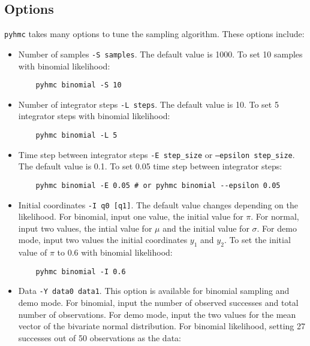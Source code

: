 \documentclass[10pt,letterpaper]{article}
\begin{document}

\subsection{Options}
\label{sub:options}

\texttt{pyhmc} takes many options to tune the sampling algorithm.  These
options include:

\begin{itemize}
	\item Number of samples \texttt{-S samples}.  The default value is 1000.  To set 10
samples with binomial likelihood:

\begin{verbatim}
	pyhmc binomial -S 10
\end{verbatim}

	\item Number of integrator steps \texttt{-L steps}.  The default value is
		10.  To set 5 integrator steps with binomial likelihood:

\begin{verbatim}
	pyhmc binomial -L 5
\end{verbatim}
	
	\item Time step between integrator steps \texttt{-E step\_size} or
		\texttt{--epsilon step\_size}.  The default value is
		0.1.  To set 0.05 time step between integrator steps:

\begin{verbatim}
	pyhmc binomial -E 0.05 # or pyhmc binomial --epsilon 0.05
\end{verbatim}

	\item Initial coordinates \texttt{-I q0 [q1]}.  The default value changes
		depending on the likelihood.  For binomial, input one value, the
		initial value for $\pi$.  For normal, input two values, the intial
		value for $\mu$ and the initial value for $\sigma$.  For demo mode,
		input two values the initial coordinates $y_1$ and $y_2$.  To set the
		initial value of $\pi$ to 0.6 with binomial likelihood:

\begin{verbatim}
	pyhmc binomial -I 0.6
\end{verbatim}

	\item Data \texttt{-Y data0 data1}.  This option is available for binomial
		sampling and demo mode.  For binomial, input the number of observed
		successes and total number of observations.  For demo mode, input the
		two values for the mean vector of the bivariate normal distribution.
		For binomial likelihood, setting 27 successes out of 50 observations as
		the data:


\end{itemize}
\end{document}
